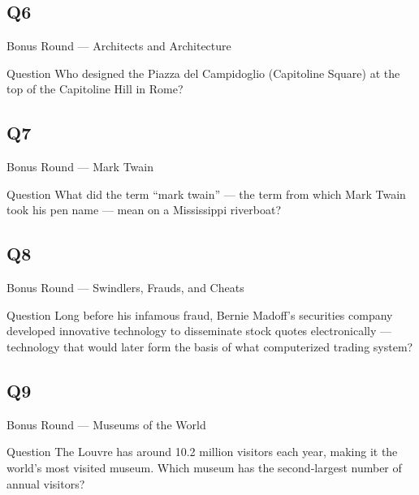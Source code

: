 \documentclass[11pt]{beamer}
\begin{document}
\subsection*{Q6}
\begin{frame}[t]{Bonus Round --- Architects and Architecture}
\vspace{-0.5em}
\begin{block}{Question}
Who designed the Piazza del Campidoglio (Capitoline Square) at the top of the Capitoline Hill in Rome?
\end{block}
\end{frame}
\subsection*{Q7}
\begin{frame}[t]{Bonus Round --- Mark Twain}
\vspace{-0.5em}
\begin{block}{Question}
What did the term ``mark twain'' --- the term from which Mark Twain took his pen name --- mean on a Mississippi riverboat?
\end{block}
\end{frame}
\subsection*{Q8}
\begin{frame}[t]{Bonus Round --- Swindlers, Frauds, and Cheats}
\vspace{-0.5em}
\begin{block}{Question}
Long before his infamous fraud, Bernie Madoff's securities company developed innovative technology to disseminate stock quotes electronically --- technology that would later form the basis of what computerized trading system?
\end{block}
\end{frame}
\subsection*{Q9}
\begin{frame}[t]{Bonus Round --- Museums of the World}
\vspace{-0.5em}
\begin{block}{Question}
The Louvre has around 10.2 million visitors each year, making it the world's most visited museum. Which museum has the second-largest number of annual visitors?
\end{block}
\end{frame}
\end{document}
